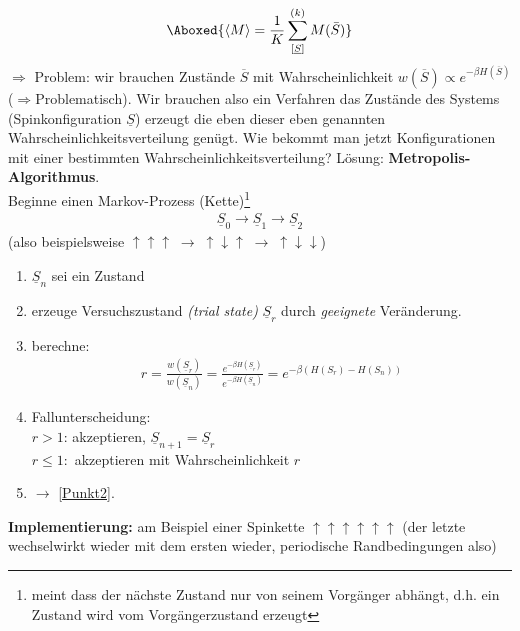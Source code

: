 \documentclass[12pt]{article}
\begin{document}
\begin{align}
\Aboxed{ \langle M \rangle = \frac{1}{K} \sum_{ [\underline{S}]}^{(k)} M(\bar{S})}
\end{align}
$\Rightarrow$ Problem: wir brauchen Zustände $\overline{S}$ mit Wahrscheinlichkeit $w(\overline{S})\propto e^{-\beta H(\overline{S})}$ ($\Rightarrow$Problematisch). Wir brauchen also ein Verfahren das Zustände des Systems (Spinkonfiguration $\underline{S}$) erzeugt die eben dieser eben genannten Wahrscheinlichkeitsverteilung genügt. Wie bekommt man jetzt Konfigurationen mit einer bestimmten Wahrscheinlichkeitsverteilung? 
Lösung: \textbf{ Metropolis-Algorithmus}. \\

Beginne einen Markov-Prozess (Kette)\footnote{meint dass der nächste Zustand nur von seinem Vorgänger abhängt, d.h. ein Zustand wird vom Vorgängerzustand erzeugt} 
\begin{align*}
\underline{S}_0 \rightarrow \underline{S}_1 \rightarrow \underline{S}_2
\end{align*}
(also beispielsweise $\uparrow \uparrow \uparrow \; \rightarrow \; \uparrow \downarrow \uparrow \; \rightarrow \; \uparrow \downarrow \downarrow$)

\begin{enumerate}
\item $\underline{S}_n $ sei ein Zustand
\item \label{Punkt2} erzeuge Versuchszustand \textit{(trial state)} $\underline{S}_r$ durch \textit{geeignete} Veränderung.
\item berechne: 
\begin{align}
r= \frac{w(\underline{S}_r)}{w(\underline{S}_n)} = \frac{e^{- \beta H(\underline{S}_r )}}{e^{- \beta H(\underline{S}_n )}}= e^{-\beta (H(S_r)-H(S_n))}
\end{align}

\item Fallunterscheidung: \\ 
$r>1$: akzeptieren, $\underline{S}_{n+1} = \underline{S}_r$\\
$r \leq 1:$ akzeptieren mit Wahrscheinlichkeit $r$
\item  $\rightarrow$ \ref{Punkt2}.
\end{enumerate}
\textbf{Implementierung:} am Beispiel einer Spinkette $\uparrow \uparrow \uparrow \uparrow \uparrow \uparrow$ (der letzte wechselwirkt wieder mit dem ersten wieder, periodische Randbedingungen also)
\end{document}
